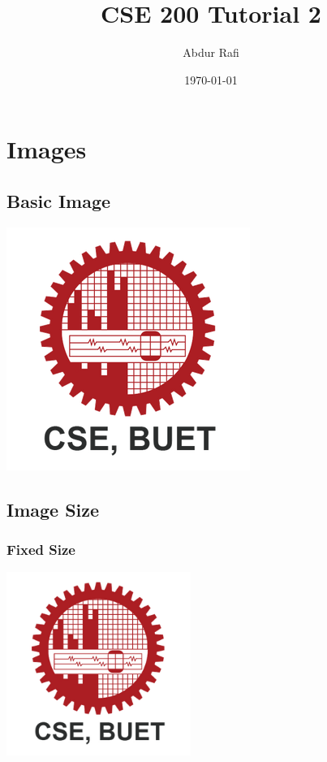 \documentclass{article}
\title{CSE 200 Tutorial 2}
\author{Abdur Rafi}
\date{\today}
\begin{document}
\maketitle
\tableofcontents
\listoffigures

\pagebreak

\section{Images}
\subsection{Basic Image}

\includegraphics{Images/CSE_BUET.png}

\pagebreak


\subsection{Image Size}

\subsubsection{Fixed Size} 
\includegraphics[width=6cm]{Images/CSE_BUET.png}   \\ %
      
\end{document}
